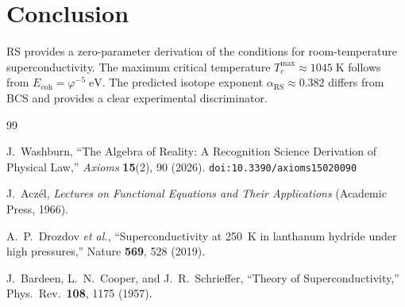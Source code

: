 \documentclass[12pt,a4paper]{article}
\theoremstyle{definition}
\theoremstyle{remark}
\begin{document}
\section{Conclusion}
\label{sec:conclusion}

RS provides a zero-parameter derivation of the conditions for
room-temperature superconductivity.  The maximum critical
temperature $T_c^{\max} \approx 1045\;\mathrm{K}$ follows from
$E_{\mathrm{coh}} = \varphi^{-5}\;\mathrm{eV}$.  The predicted
isotope exponent $\alpha_{\mathrm{RS}} \approx 0.382$ differs from
BCS and provides a clear experimental discriminator.

\begin{thebibliography}{99}

J.~Washburn, ``The Algebra of Reality: A Recognition Science Derivation
of Physical Law,'' \emph{Axioms} \textbf{15}(2), 90 (2026).
\texttt{doi:10.3390/axioms15020090}

J.~Acz\'el, \emph{Lectures on Functional Equations and Their
Applications} (Academic Press, 1966).

A.~P.~Drozdov \textit{et al.}, ``Superconductivity at 250~K in
lanthanum hydride under high pressures,'' Nature \textbf{569},
528 (2019).

J.~Bardeen, L.~N.~Cooper, and J.~R.~Schrieffer, ``Theory of
Superconductivity,'' Phys.\ Rev.\ \textbf{108}, 1175 (1957).

\end{thebibliography}
\end{document}
